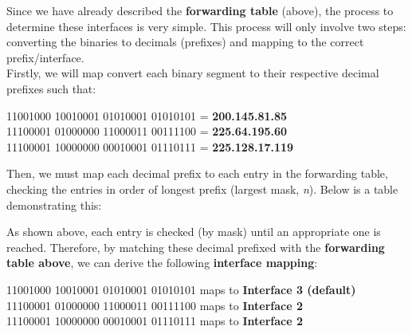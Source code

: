 \documentclass[colorlinks=true, allcolors=blue]{article}
\begin{document}
Since we have already described the \textbf{forwarding table} (above), the process to determine these interfaces is very simple. This process will only involve two steps: converting the binaries to decimals (prefixes) and mapping to the correct prefix/interface. \\

Firstly, we will map convert each binary segment to their respective decimal prefixes such that:
\begin{center}
    11001000 10010001 01010001 01010101 = \textbf{200.145.81.85}\\
    11100001 01000000 11000011 00111100 = \textbf{225.64.195.60}\\
    11100001 10000000 00010001 01110111 = \textbf{225.128.17.119}
\end{center}

Then, we must map each decimal prefix to each entry in the forwarding table, checking the entries in order of longest prefix (largest mask, \textit{n}). Below is a table demonstrating this:

\begin{table}[ht]
  \centering
\end{table}

As shown above, each entry is checked (by mask) until an appropriate one is reached. Therefore, by matching these decimal prefixed with the \textbf{forwarding table above}, we can derive the following \textbf{interface mapping}:
\begin{center}
    11001000 10010001 01010001 01010101 maps to \textbf{Interface 3 (default)}\\
    11100001 01000000 11000011 00111100 maps to \textbf{Interface 2}\\
    11100001 10000000 00010001 01110111 maps to \textbf{Interface 2}
\end{center}
\end{document}
